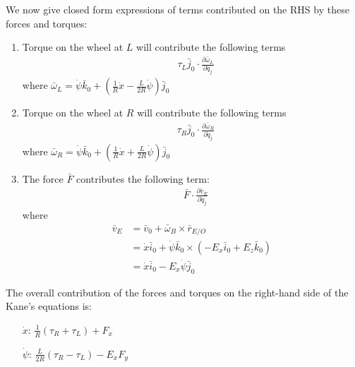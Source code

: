\documentclass[a4paper,10pt]{article}
\begin{document}
\vspace{5mm}

We now give closed form expressions of terms contributed on the RHS by these forces and torques:

\vspace{5mm} 
\begin{enumerate}
 \item Torque on the wheel at $L$ will contribute the following terms
\begin{align}
 & \tau_L\bar{j}_0 \cdot \frac{\partial \bar{\omega}_L}{\partial \dot{q}_j}
\end{align}
where $\bar{\omega}_L = \dot\psi\bar{k}_0 + \left(\frac{1}{R}\dot{x}-\frac{L}{2R}\dot\psi\right)\bar{j}_0$

\vspace{5mm}

 \item Torque on the wheel at $R$ will contribute the following terms
\begin{align}
 & \tau_R\bar{j}_0 \cdot \frac{\partial \bar{\omega}_R}{\partial \dot{q}_j}
\end{align}
where $\bar{\omega}_R = \dot\psi\bar{k}_0 + \left(\frac{1}{R}\dot{x}+\frac{L}{2R}\dot\psi\right)\bar{j}_0$

\vspace{5mm}
 \item The force $\bar{F}$ contributes the following term:
\begin{align}
 & \bar{F} \cdot \frac{\partial \bar{v}_E}{\partial \dot{q}_j}
\end{align}
where 
\begin{align}
 \bar{v}_E &= \bar{v}_0 + \bar\omega_B \times \bar{r}_{E/O} \nonumber \\
 &= \dot{x}\bar{i}_0 + \dot\psi\bar{k}_0 \times \left( -E_x\bar{i}_0 + E_z\bar{k}_0 \right) \nonumber \\
 &= \dot{x}\bar{i}_0 - E_x\dot\psi\bar{j}_0
\end{align}
\end{enumerate}

The overall contribution of the forces and torques on the right-hand side of the Kane's equations is:
\begin{itemize}[label={}]
 \item[$\dot{x}$:]  $\frac{1}{R}\left(\tau_R + \tau_L\right) + F_x$
 \item[$\dot\psi$:] $\frac{L}{2R}\left(\tau_R-\tau_L\right) - E_xF_y$
\end{itemize}
\end{document}
